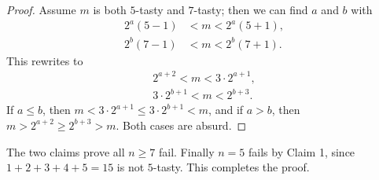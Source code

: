 \begin{proof}
    Assume $m$ is both $5$-tasty and $7$-tasty; then we can find $a$ and $b$ with
    \begin{align*}
        2^a(5-1)&<m<2^a(5+1),\\
        2^b(7-1)&<m<2^b(7+1).
    \end{align*}
    This rewrites to
    \begin{align*}
        2^{a+2}<m<3\cdot2^{a+1},\\
        3\cdot2^{b+1}<m<2^{b+3}.
    \end{align*}
    If $a\le b$, then $m<3\cdot2^{a+1}\le3\cdot2^{b+1}<m$, and if $a>b$, then $m>2^{a+2}\ge2^{b+3}>m$. Both cases are absurd.
\end{proof}

The two claims prove all $n\ge7$ fail. Finally $n=5$ fails by Claim 1, since $1+2+3+4+5=15$ is not $5$-tasty. This completes the proof.
